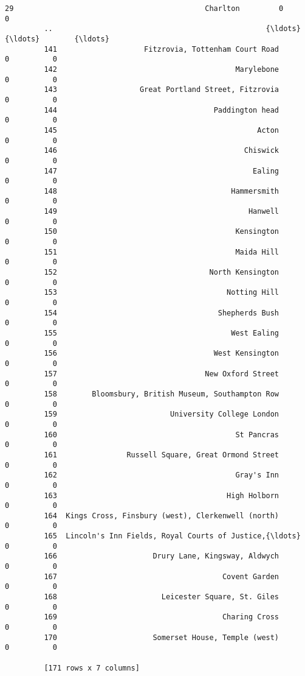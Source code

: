 \documentclass[11pt]{article}
\begin{document}
\begin{Verbatim}[commandchars=\\\{\}]
         29                                            Charlton         0          0  
         ..                                                 {\ldots}       {\ldots}        {\ldots}  
         141                    Fitzrovia, Tottenham Court Road         0          0  
         142                                         Marylebone         0          0  
         143                   Great Portland Street, Fitzrovia         0          0  
         144                                    Paddington head         0          0  
         145                                              Acton         0          0  
         146                                           Chiswick         0          0  
         147                                             Ealing         0          0  
         148                                        Hammersmith         0          0  
         149                                            Hanwell         0          0  
         150                                         Kensington         0          0  
         151                                         Maida Hill         0          0  
         152                                   North Kensington         0          0  
         153                                       Notting Hill         0          0  
         154                                     Shepherds Bush         0          0  
         155                                        West Ealing         0          0  
         156                                    West Kensington         0          0  
         157                                  New Oxford Street         0          0  
         158        Bloomsbury, British Museum, Southampton Row         0          0  
         159                          University College London         0          0  
         160                                         St Pancras         0          0  
         161                Russell Square, Great Ormond Street         0          0  
         162                                         Gray's Inn         0          0  
         163                                       High Holborn         0          0  
         164  Kings Cross, Finsbury (west), Clerkenwell (north)         0          0  
         165  Lincoln's Inn Fields, Royal Courts of Justice,{\ldots}         0          0  
         166                      Drury Lane, Kingsway, Aldwych         0          0  
         167                                      Covent Garden         0          0  
         168                        Leicester Square, St. Giles         0          0  
         169                                      Charing Cross         0          0  
         170                      Somerset House, Temple (west)         0          0  
         
         [171 rows x 7 columns]
\end{Verbatim}
            
\end{document}
